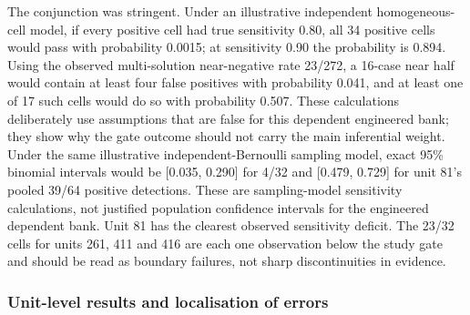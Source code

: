 \documentclass[
  british,
  11pt,
  a4paper,
]{article}
\begin{document}
The conjunction was stringent. Under an illustrative independent
homogeneous-cell model, if every positive cell had true sensitivity
0.80, all 34 positive cells would pass with probability 0.0015; at
sensitivity 0.90 the probability is 0.894. Using the observed
multi-solution near-negative rate 23/272, a 16-case near half would
contain at least four false positives with probability 0.041, and at
least one of 17 such cells would do so with probability 0.507. These
calculations deliberately use assumptions that are false for this
dependent engineered bank; they show why the gate outcome should not
carry the main inferential weight. Under the same illustrative
independent-Bernoulli sampling model, exact 95\% binomial intervals
would be {[}0.035, 0.290{]} for 4/32 and {[}0.479, 0.729{]} for unit
81's pooled 39/64 positive detections. These are sampling-model
sensitivity calculations, not justified population confidence intervals
for the engineered dependent bank. Unit 81 has the clearest observed
sensitivity deficit. The 23/32 cells for units 261, 411 and 416 are each
one observation below the study gate and should be read as boundary
failures, not sharp discontinuities in evidence.

\subsubsection{Unit-level results and localisation of
errors}\label{unit-level-results-and-localisation-of-errors}
\end{document}
